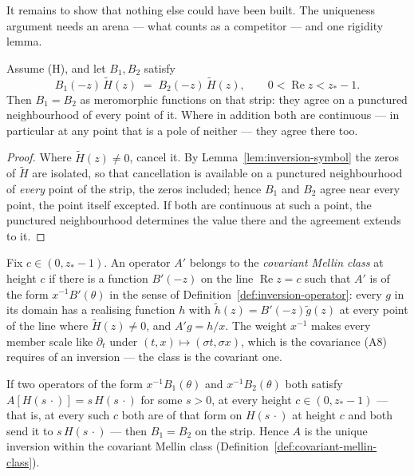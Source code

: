 It remains to show that nothing else could have been built. The uniqueness argument
needs an arena --- what counts as a competitor --- and one rigidity lemma.

\begin{lemma}\label{lem:symbol-rigidity}
Assume (H), and let $B_1, B_2$ satisfy
\[
  B_1(-z)\,\tilde H(z) \;=\; B_2(-z)\,\tilde H(z),
  \qquad 0 < \operatorname{Re} z < z_* - 1 .
\]
Then $B_1 = B_2$ as meromorphic functions on that strip: they agree on a punctured
neighbourhood of every point of it. Where in addition both are continuous --- in particular at
any point that is a pole of neither --- they agree there too.
\end{lemma}

\begin{proof}
Where $\tilde H(z) \ne 0$, cancel it. By Lemma~\ref{lem:inversion-symbol} the zeros of
$\tilde H$ are isolated, so that cancellation is available on a punctured neighbourhood of
\emph{every} point of the strip, the zeros included; hence $B_1$ and $B_2$ agree near every
point, the point itself excepted. If both are continuous at such a point, the punctured
neighbourhood determines the value there and the agreement extends to it.
\end{proof}

\begin{definition}\label{def:covariant-mellin-class}
Fix $c \in (0, z_* - 1)$. An operator $A'$ belongs to the \emph{covariant Mellin class} at
height $c$ if there is a function $B'(-z)$ on the line $\operatorname{Re} z = c$ such that $A'$
is of the form $x^{-1}B'(\theta)$ in the sense of Definition~\ref{def:inversion-operator}: every
$g$ in its domain has a realising function $h$ with $\tilde h(z) = B'(-z)\tilde g(z)$ at every
point of the line where $\tilde H(z) \ne 0$, and $A'g = h/x$. The weight $x^{-1}$ makes every
member scale like $\partial_t$ under $(t,x) \mapsto (\sigma t, \sigma x)$, which is the
covariance (A8) requires of an inversion --- the class is the covariant one.
\end{definition}

\begin{lemma}\label{lem:symbol-uniqueness}
If two operators of the form $x^{-1}B_1(\theta)$ and $x^{-1}B_2(\theta)$ both satisfy
$A[H(s\,\cdot)] = s\,H(s\,\cdot)$ for some $s > 0$, at every height $c \in (0, z_* - 1)$ --- that
is, at every such $c$ both are of that form on $H(s\,\cdot)$ at height $c$ and both send it to
$s\,H(s\,\cdot)$ --- then $B_1 = B_2$ on the strip. Hence $A$ is the unique inversion within the
covariant Mellin class (Definition~\ref{def:covariant-mellin-class}).
\end{lemma}

